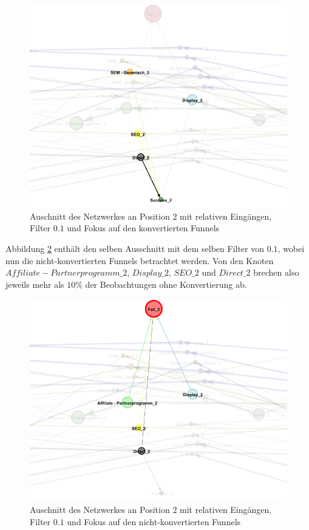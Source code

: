 \begin{figure}[H]
	\centering\includegraphics[scale=0.4]{in_filter_10_succ.png}\caption{Auschnitt des Netzwerkes an Position $2$ mit relativen Eingängen, Filter $0.1$ und Fokus auf den konvertierten Funnels}\label{in_filter_10_succ}
\end{figure}
Abbildung \ref{in_filter_10_fail} enthält den selben Ausschnitt mit dem selben Filter von $0.1$, wobei nun die nicht-konvertierten Funnels betrachtet werden. Von den Knoten $Affiliate-Partnerprogramm\_2$, $Display\_2$, $SEO\_2$ und $Direct\_2$ brechen also jeweils mehr als $10\%$ der Beobachtungen ohne Konvertierung ab.
\begin{figure}[H]
	\centering\includegraphics[scale=0.4]{in_filter_10_fail.png}\caption{Auschnitt des Netzwerkes an Position $2$ mit relativen Eingängen, Filter $0.1$ und Fokus auf den nicht-konvertierten Funnels}\label{in_filter_10_fail}
\end{figure}